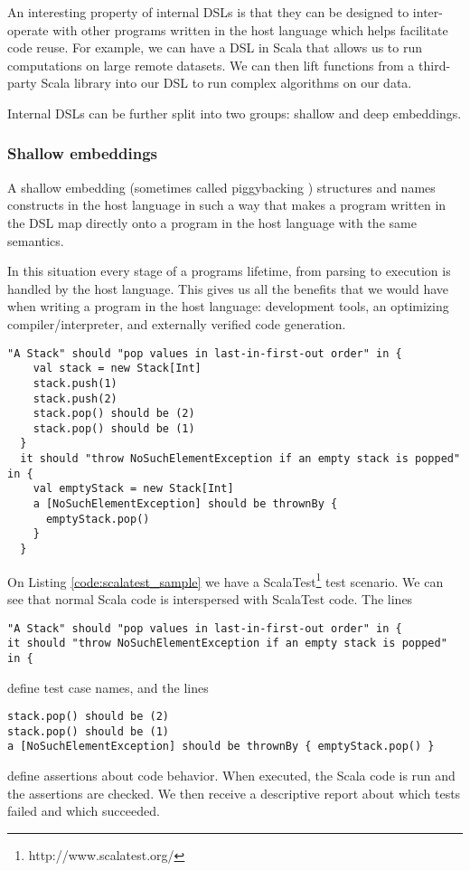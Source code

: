 An interesting property of internal DSLs is that they can be designed to inter-operate with other programs written in the host language which helps facilitate code reuse. For example, we can have a DSL in Scala that allows us to run computations on large remote datasets. We can then lift functions from a third-party Scala library into our DSL to run complex algorithms on our data.

Internal DSLs can be further split into two groups: shallow and deep embeddings.

\subsubsection{Shallow embeddings}

A shallow embedding (sometimes called piggybacking \autocite{Mernik:2005}) structures and names constructs in the host language in such a way that makes a program written in the DSL map directly onto a program in the host language with the same semantics.

In this situation every stage of a programs lifetime, from parsing to execution is handled by the host language. This gives us all the benefits that we would have when writing a program in the host language: development tools, an optimizing compiler/interpreter, and externally verified code generation.

\begin{lstlisting}[caption=Example ScalaTest code, label=code:scalatest_sample]
  "A Stack" should "pop values in last-in-first-out order" in {
    val stack = new Stack[Int]
    stack.push(1)
    stack.push(2)
    stack.pop() should be (2)
    stack.pop() should be (1)
  }
  it should "throw NoSuchElementException if an empty stack is popped" in {
    val emptyStack = new Stack[Int]
    a [NoSuchElementException] should be thrownBy {
      emptyStack.pop()
    } 
  }
\end{lstlisting}

On Listing \ref{code:scalatest_sample} we have a ScalaTest\footnote{http://www.scalatest.org/} test scenario. We can see that normal Scala code is interspersed with ScalaTest code.
The lines
\begin{verbatim}
"A Stack" should "pop values in last-in-first-out order" in {
it should "throw NoSuchElementException if an empty stack is popped" in {
\end{verbatim}
define test case names, and the lines
\begin{verbatim}
stack.pop() should be (2)
stack.pop() should be (1)
a [NoSuchElementException] should be thrownBy { emptyStack.pop() }
\end{verbatim}
define assertions about code behavior. When executed, the Scala code is run and the assertions are checked. We then receive a descriptive report about which tests failed and which succeeded.


